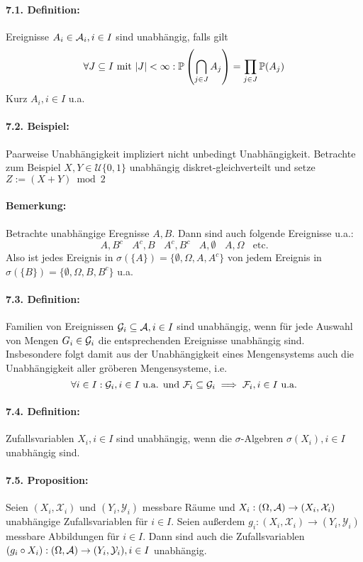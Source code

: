\documentclass[12pt]{report}
\begin{document}
\paragraph{7.1. Definition:}Ereignisse $A_i\in\mathcal{A}_i,i\in I$ sind unabh\"angig, falls gilt
$$\forall J\subseteq I\text{ mit }|J|<\infty:\mathbb{P}\left(\bigcap_{j\in J}A_j\right)=\prod_{j\in J}\mathbb{P}(A_j)$$ 
Kurz $A_i,i\in I$ u.a.

\paragraph{7.2. Beispiel:}Paarweise Unabh\"angigkeit impliziert nicht unbedingt Unabh\"angigkeit. Betrachte zum Beispiel $X,Y\in \mathcal{U}\{0,1\}$ unabh\"angig diskret-gleichverteilt und setze $Z:=(X+Y)\bmod 2$
 
\paragraph{Bemerkung:}Betrachte unabh\"angige Eregnisse $A,B$. Dann sind auch folgende Ereignisse u.a.:
$$A,B^c\ \ \ \ A^c,B\ \ \ \ A^c,B^c\ \ \ \ A,\emptyset\ \ \ \ A,\Omega\ \ \ \ \text{etc.}$$
Also ist jedes Ereignis in $\sigma(\{A\})=\{\emptyset,\Omega,A,A^c\}$ von jedem Ereignis in $\sigma(\{B\})=\{\emptyset,\Omega,B,B^c\}$ u.a.

\paragraph{7.3. Definition:}Familien von Ereignissen $\mathcal{G}_i\subseteq\mathcal{A},i\in I$ sind unabh\"angig, wenn f\"ur jede Auswahl von Mengen $G_i\in\mathcal{G}_i$ die entsprechenden Ereignisse unabh\"angig sind. Insbesondere folgt damit aus der Unabh\"angigkeit eines Mengensystems auch die Unabh\"angigkeit aller gr\"oberen Mengensysteme, i.e.
$$\forall i\in I:\mathcal{G}_i,i\in I\text{ u.a. und }\mathcal{F}_i\subseteq\mathcal{G}_i\implies \mathcal{F}_i,i\in I\text{ u.a.}$$

\paragraph{7.4. Definition:}Zufallsvariablen $X_i,i\in I$ sind unabh\"angig, wenn die $\sigma$-Algebren $\sigma(X_i),i\in I$ unabh\"angig sind.

\paragraph{7.5. Proposition:}Seien $(X_i,\mathcal{X}_i)$ und $(Y_i,\mathcal{Y}_i)$ messbare R\"aume und $X_i:(\Omega,\mathcal{A})\to(X_i,\mathcal{X}_i)$ unabh\"angige Zufallsvariablen f\"ur $i\in I$. Seien au\ss{}erdem $g_i:(X_i,\mathcal{X}_i)\to(Y_i,\mathcal{Y}_i)$ messbare Abbildungen f\"ur $i\in I$. Dann sind auch die Zufallsvariablen $(g_i\circ X_i):(\Omega,\mathcal{A})\to(Y_i,\mathcal{Y}_i), i\in I$ unabh\"angig. 
\end{document}
